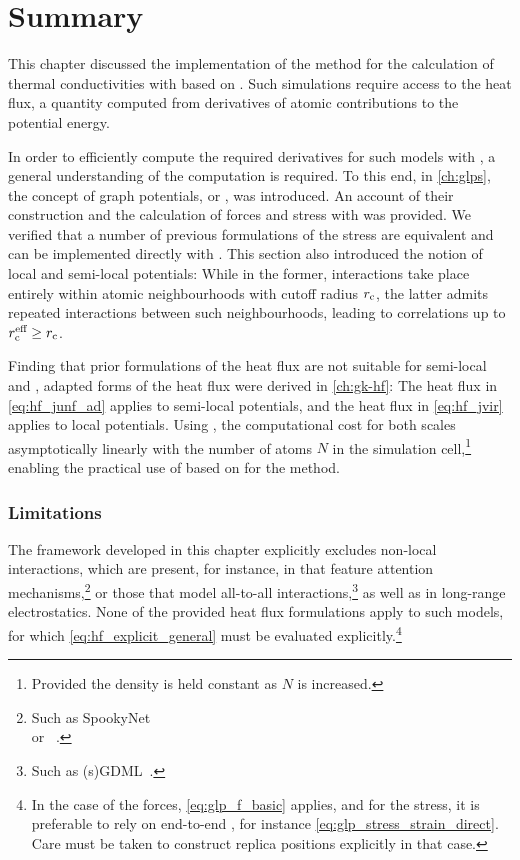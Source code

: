 
\chapter{Summary}
\label{ch:hf-end}


This chapter discussed the implementation of the \gk method for the calculation of thermal conductivities with \mlps based on \mpnns. Such simulations require access to the heat flux, a quantity computed from derivatives of atomic contributions to the potential energy.

In order to efficiently compute the required derivatives for such models with \ad, a general understanding of the  computation is required.
To this end, in \cref{ch:glps}, the concept of graph potentials, or \glps, was introduced. An account of their construction and the calculation of forces and stress with \ad was provided. We verified that a number of previous formulations of the stress are equivalent and can be implemented directly with \ad.
This section also introduced the notion of local and semi-local potentials: While in the former, interactions take place entirely within atomic neighbourhoods with cutoff radius $r_{\text{c}}$, the latter admits repeated interactions between such neighbourhoods, leading to correlations up to $r_{\text{c}}^{\text{eff}} \geq r_{\text{c}}$.

Finding that prior formulations of the heat flux are not suitable for semi-local \glps and \ad, adapted forms of the heat flux were derived in \cref{ch:gk-hf}: The  heat flux in \cref{eq:hf_junf_ad} applies to semi-local potentials, and the  heat flux in \cref{eq:hf_jvir} applies to local potentials. Using \ad, the computational cost for both scales asymptotically linearly with the number of atoms $N$ in the simulation cell,\footnote{Provided the density is held constant as $N$ is increased.} enabling the practical use of \mlps based on \mpnns for the \gk method.

\subsection*{Limitations}

The framework developed in this chapter explicitly excludes non-local interactions, which are present, for instance, in \mlps that feature attention mechanisms,\footnote{Such as SpookyNet~\cite{ucsm2021q}\\ or \sok~\cite{fum2022q}.} or those that model all-to-all interactions,\footnote{Such as (s)GDML~\cite{ctsm2017q,csmt2018q,csmt2019q}.} as well as in long-range electrostatics.
None of the provided heat flux formulations apply to such models, for which \cref{eq:hf_explicit_general} must be evaluated explicitly.\footnote{In the case of the forces, \cref{eq:glp_f_basic} applies, and for the stress, it is preferable to rely on end-to-end \ad, for instance \cref{eq:glp_stress_strain_direct}. Care must be taken to construct replica positions explicitly in that case.}

